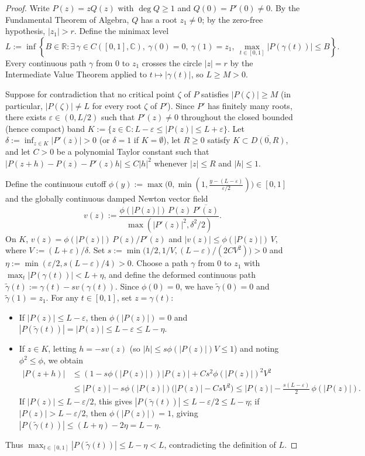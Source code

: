 \documentclass[11pt,a4paper]{article}
\theoremstyle{definition}
\theoremstyle{remark}
\newcommand{\CC}{\mathbb{C}}
\newcommand{\RR}{\mathbb{R}}
\begin{document}
\begin{proof}
Write $P(z) = z Q(z)$ with $\deg Q \ge 1$ and $Q(0) = P'(0) \neq 0$. By the Fundamental Theorem of Algebra, $Q$ has a root $z_1 \neq 0$; by the zero-free hypothesis, $|z_1| > r$. Define the minimax level
\[
L := \inf \left\{ B \in \RR : \exists\, \gamma \in C([0,1], \CC),\ \gamma(0) = 0,\ \gamma(1) = z_1,\ \max_{t \in [0,1]} |P(\gamma(t))| \le B \right\}.
\]
Every continuous path $\gamma$ from $0$ to $z_1$ crosses the circle $|z| = r$ by the Intermediate Value Theorem applied to $t \mapsto |\gamma(t)|$, so $L \ge M > 0$.

Suppose for contradiction that no critical point $\zeta$ of $P$ satisfies $|P(\zeta)| \ge M$ (in particular, $|P(\zeta)| \neq L$ for every root $\zeta$ of $P'$). Since $P'$ has finitely many roots, there exists $\varepsilon \in (0, L/2)$ such that $P'(z) \neq 0$ throughout the closed bounded (hence compact) band $K := \{z \in \CC : L - \varepsilon \le |P(z)| \le L + \varepsilon\}$. Let $\delta := \inf_{z \in K} |P'(z)| > 0$ (or $\delta = 1$ if $K = \emptyset$), let $R \ge 0$ satisfy $K \subset \overline{D(0, R)}$, and let $C > 0$ be a polynomial Taylor constant such that $|P(z + h) - P(z) - P'(z)h| \le C|h|^2$ whenever $|z| \le R$ and $|h| \le 1$.

Define the continuous cutoff $\phi(y) := \max\bigl(0, \min(1, \frac{y - (L - \varepsilon)}{\varepsilon/2})\bigr) \in [0, 1]$ and the globally continuous damped Newton vector field
\[
v(z) := \frac{\phi(|P(z)|)\, P(z)\, \overline{P'(z)}}{\max(|P'(z)|^2, \delta^2/2)}.
\]
On $K$, $v(z) = \phi(|P(z)|)\, P(z)/P'(z)$ and $|v(z)| \le \phi(|P(z)|)\, V$, where $V := (L + \varepsilon)/\delta$. Set $s := \min\bigl(1/2, 1/V, (L - \varepsilon)/(2 C V^2)\bigr) > 0$ and $\eta := \min(\varepsilon/2, s(L - \varepsilon)/4) > 0$. Choose a path $\gamma$ from $0$ to $z_1$ with $\max_t |P(\gamma(t))| < L + \eta$, and define the deformed continuous path $\tilde{\gamma}(t) := \gamma(t) - s v(\gamma(t))$. Since $\phi(0) = 0$, we have $\tilde{\gamma}(0) = 0$ and $\tilde{\gamma}(1) = z_1$. For any $t \in [0, 1]$, set $z = \gamma(t)$:
\begin{itemize}
\item If $|P(z)| \le L - \varepsilon$, then $\phi(|P(z)|) = 0$ and $|P(\tilde{\gamma}(t))| = |P(z)| \le L - \varepsilon \le L - \eta$.
\item If $z \in K$, letting $h = -s v(z)$ (so $|h| \le s \phi(|P(z)|) V \le 1$) and noting $\phi^2 \le \phi$, we obtain
\begin{align*}
|P(z + h)| &\le (1 - s \phi(|P(z)|))|P(z)| + C s^2 \phi(|P(z)|)^2 V^2 \\
&\le |P(z)| - s \phi(|P(z)|)\bigl(|P(z)| - C s V^2\bigr) \le |P(z)| - \frac{s(L - \varepsilon)}{2}\,\phi(|P(z)|).
\end{align*}
If $|P(z)| \le L - \varepsilon/2$, this gives $|P(\tilde{\gamma}(t))| \le L - \varepsilon/2 \le L - \eta$; if $|P(z)| > L - \varepsilon/2$, then $\phi(|P(z)|) = 1$, giving $|P(\tilde{\gamma}(t))| \le (L + \eta) - 2\eta = L - \eta$.
\end{itemize}
Thus $\max_{t \in [0,1]} |P(\tilde{\gamma}(t))| \le L - \eta < L$, contradicting the definition of $L$.
\end{proof}
\end{document}
